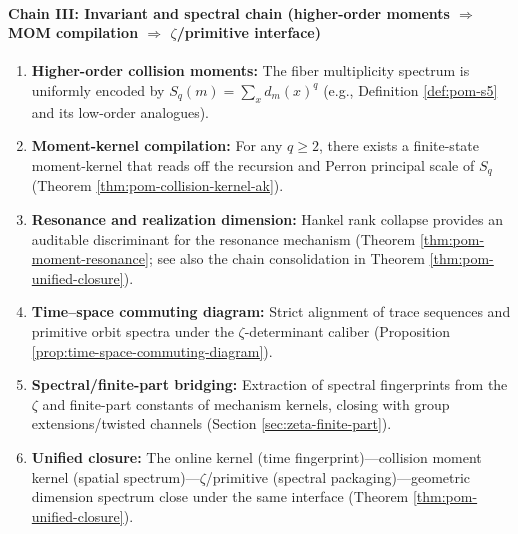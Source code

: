 \paragraph{Chain III: Invariant and spectral chain (higher-order moments \texorpdfstring{$\Rightarrow$}{=>} MOM compilation \texorpdfstring{$\Rightarrow$}{=>} \texorpdfstring{$\zeta$}{zeta}/primitive interface)}
\begin{enumerate}
  \item \textbf{Higher-order collision moments:} The fiber multiplicity spectrum is uniformly encoded by \(S_q(m)=\sum_x d_m(x)^q\) (e.g., Definition \ref{def:pom-s5} and its low-order analogues).
  \item \textbf{Moment-kernel compilation:} For any \(q\ge 2\), there exists a finite-state moment-kernel that reads off the recursion and Perron principal scale of \(S_q\) (Theorem \ref{thm:pom-collision-kernel-ak}).
  \item \textbf{Resonance and realization dimension:} Hankel rank collapse provides an auditable discriminant for the resonance mechanism (Theorem \ref{thm:pom-moment-resonance}; see also the chain consolidation in Theorem \ref{thm:pom-unified-closure}).
  \item \textbf{Time--space commuting diagram:} Strict alignment of trace sequences and primitive orbit spectra under the \(\zeta\)-determinant caliber (Proposition \ref{prop:time-space-commuting-diagram}).
  \item \textbf{Spectral/finite-part bridging:} Extraction of spectral fingerprints from the \(\zeta\) and finite-part constants of mechanism kernels, closing with group extensions/twisted channels (Section \ref{sec:zeta-finite-part}).
  \item \textbf{Unified closure:} The online kernel (time fingerprint)---collision moment kernel (spatial spectrum)---\(\zeta\)/primitive (spectral packaging)---geometric dimension spectrum close under the same interface (Theorem \ref{thm:pom-unified-closure}).
\end{enumerate}
